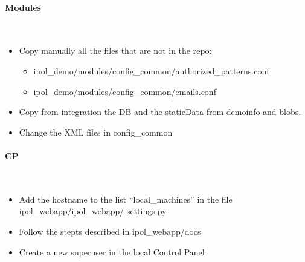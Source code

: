 \paragraph{Modules} \hspace{0pt} \\
\begin{itemize}
 \item Copy manually all the files that are not in the repo:
 
  \begin{itemize}
   \item ipol\_demo/modules/config\_common/authorized\_patterns.conf
   \item ipol\_demo/modules/config\_common/emails.conf
  \end{itemize}

 \item Copy from integration the DB and the staticData from demoinfo and blobs.
 \item Change the XML files in config\_common
\end{itemize}

\paragraph{CP} \hspace{0pt} \\
\begin{itemize}
 \item Add the hostname to the list ``local\_machines'' in the file ipol\_webapp/ipol\_webapp/ settings.py
 \item Follow the stepts described in ipol\_webapp/docs
 \item Create a new superuser in the local Control Panel
\end{itemize}